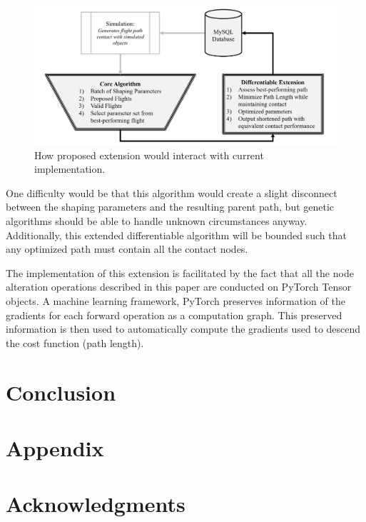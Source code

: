 \documentclass[conf]{new-aiaa}
\begin{document}
\begin{figure}[hbt!]
\centering
\includegraphics[width=1\textwidth]{figs/future-extension}
\caption{How proposed extension would interact with current implementation.}
\label{future-extension}
\end{figure}

One difficulty would be that this algorithm would create a slight disconnect between the shaping parameters and the resulting parent path, but genetic algorithms should be able to handle unknown circumstances anyway. Additionally, this extended differentiable algorithm will be bounded such that any optimized path must contain all the contact nodes.

The implementation of this extension is facilitated by the fact that all the node alteration operations described in this paper are conducted on PyTorch Tensor objects. A machine learning framework, PyTorch preserves information of the gradients for each forward operation as a computation graph. This preserved information is then used to automatically compute the gradients used to descend the cost function (path length).



\section{Conclusion}




\section*{Appendix}


\section*{Acknowledgments}



\end{document}
